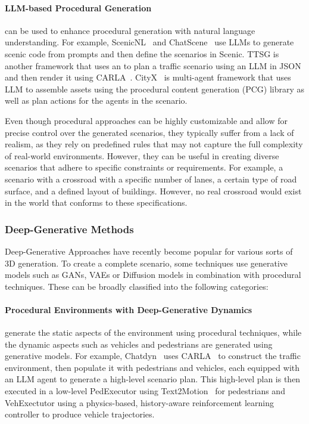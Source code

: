 \documentclass{article}
\begin{document}
\paragraph{LLM-based Procedural Generation} can be used to enhance procedural generation with natural language understanding. For example, ScenicNL~\cite{elmaaroufi2024scenicnl} and ChatScene~\cite{zhang2024chatscene} use LLMs to generate scenic code from prompts and then define the scenarios in Scenic. TTSG\cite{ruan2024traffic} is another framework that uses an to plan a traffic scenario using an LLM in JSON and then render it using CARLA~\cite{dosovitskiy2017carla}. CityX~\cite{zhang2024cityx} is multi-agent framework that uses LLM to assemble assets using the procedural content generation (PCG) library as well as plan actions for the agents in the scenario.

Even though procedural approaches can be highly customizable and allow for precise control over the generated scenarios, they typically suffer from a lack of realism, as they rely on predefined rules that may not capture the full complexity of real-world environments. However, they can be useful in creating diverse scenarios that adhere to specific constraints or requirements. For example, a scenario with a crossroad with a specific number of lanes, a certain type of road surface, and a defined layout of buildings. However, no real crossroad would exist in the world that conforms to these specifications.

\subsubsection{Deep-Generative Methods}

Deep-Generative Approaches have recently become popular for various sorts of 3D generation. To create a complete scenario, some techniques use generative models such as GANs, VAEs or Diffusion models in combination with procedural techniques. These can be broadly classified into the following categories:

\paragraph{Procedural Environments with Deep-Generative Dynamics} generate the static aspects of the environment using procedural techniques, while the dynamic aspects such as vehicles and pedestrians are generated using generative models. For example, Chatdyn~\cite{wei2024chatdyn} uses CARLA~\cite{dosovitskiy2017carla} to construct the traffic environment, then populate it with pedestrians and vehicles, each equipped with an LLM agent to generate a high-level scenario plan. This high-level plan is then executed in a low-level PedExecutor using Text2Motion~\cite{guo2024momask} for pedestrians and VehExectutor using a physics-based, history-aware reinforcement learning controller to produce vehicle trajectories.
\end{document}
